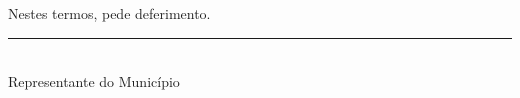 Nestes termos, pede deferimento.

\centering
\begin{minipage}{0.45\textwidth}
\vspace{2cm}
\centering
\rule{\linewidth}{0.4pt}\\
{\small Representante do Município}
\end{minipage}
